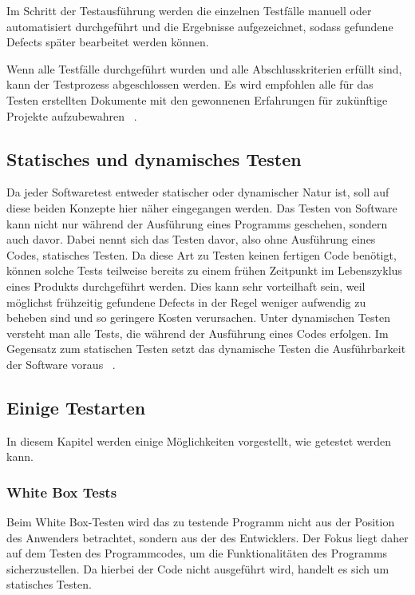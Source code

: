 Im Schritt der Testausführung werden die einzelnen Testfälle manuell oder automatisiert durchgeführt und die Ergebnisse aufgezeichnet, sodass gefundene Defects später bearbeitet werden können. 
\newline


Wenn alle Testfälle durchgeführt wurden und alle Abschlusskriterien erfüllt sind, kann der Testprozess abgeschlossen werden. Es wird empfohlen alle für das Testen erstellten Dokumente mit den gewonnenen Erfahrungen  für zukünftige Projekte aufzubewahren ~\cite{Hambling.2019}.

\subsection{Statisches und dynamisches Testen}
Da jeder Softwaretest entweder statischer oder dynamischer Natur ist, soll auf diese beiden Konzepte hier näher eingegangen werden.
Das Testen von Software kann nicht nur während der Ausführung eines Programms geschehen, sondern auch davor. Dabei nennt sich das Testen davor, also ohne Ausführung eines Codes, statisches Testen. 
Da diese Art zu Testen keinen fertigen Code benötigt, können solche Tests teilweise bereits zu einem frühen Zeitpunkt im Lebenszyklus eines Produkts durchgeführt werden. Dies kann sehr vorteilhaft sein, weil möglichst frühzeitig gefundene Defects in der Regel weniger aufwendig zu beheben sind und so geringere Kosten verursachen. 
Unter dynamischen Testen versteht man alle Tests, die während der Ausführung eines Codes erfolgen. Im Gegensatz zum statischen Testen setzt das dynamische Testen die Ausführbarkeit der Software voraus ~\cite{Hambling.2019}.


\subsection{Einige Testarten}
In diesem Kapitel werden einige Möglichkeiten vorgestellt, wie getestet werden kann.

\subsubsection{White Box Tests}
Beim White Box-Testen wird das zu testende Programm nicht aus der Position des Anwenders betrachtet, sondern aus der des Entwicklers. Der Fokus liegt daher auf dem Testen des Programmcodes, um die Funktionalitäten des Programms sicherzustellen. Da hierbei der Code nicht ausgeführt wird, handelt es sich um statisches Testen.
\newline


